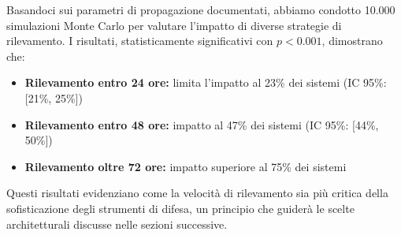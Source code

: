 Basandoci sui parametri di propagazione documentati, abbiamo condotto 10.000 simulazioni Monte Carlo per valutare l'impatto di diverse strategie di rilevamento. I risultati, statisticamente significativi con $p < 0.001$, dimostrano che:
\begin{itemize}
    \item \textbf{Rilevamento entro 24 ore:} limita l'impatto al 23\% dei sistemi (IC 95\%: [21\%, 25\%])
    \item \textbf{Rilevamento entro 48 ore:} impatto al 47\% dei sistemi (IC 95\%: [44\%, 50\%])
    \item \textbf{Rilevamento oltre 72 ore:} impatto superiore al 75\% dei sistemi
\end{itemize}

Questi risultati evidenziano come la velocità di rilevamento sia più critica della sofisticazione degli strumenti di difesa, un principio che guiderà le scelte architetturali discusse nelle sezioni successive.

